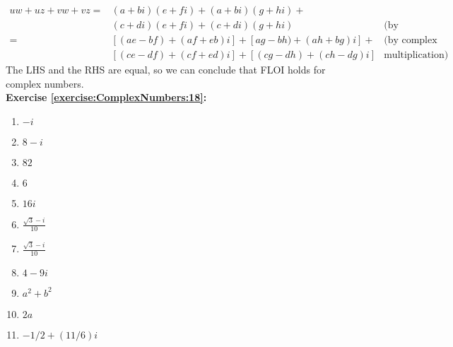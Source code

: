 \begin{align*}
uw + uz + vw + vz = &(a + bi)(e + fi) + (a + bi)(g + hi) +\\
&(c + di)(e + fi) + (c + di)(g + hi)&  \text{(by substitution)}& \\
= &[(ae - bf) + (af + eb)i] + [ag -bh) + (ah + bg)i] + & \text{(by complex }\\
&[(ce - df) + (cf + ed)i] + [(cg - dh) + (ch - dg)i]& \text{multiplication)}
\end{align*}
The LHS and the RHS are equal, so we can conclude that FLOI holds for complex numbers.\\

\noindent\textbf{Exercise \ref{exercise:ComplexNumbers:18}:}%
\begin{multicols}{2}
\begin{enumerate}[a]
\item $-i$

\item $8-i$

\item $82$

\item $6$

\item $16i$

\item $\displaystyle\frac{\sqrt{3}-i}{10}$

\item $\displaystyle\frac{\sqrt{3}-i}{10}$

\item $4-9i$

\item $a^{2}+b^{2}$

\item $2a$

\item $-1/2 + (11/6)i$

\end{enumerate}
\end{multicols}

